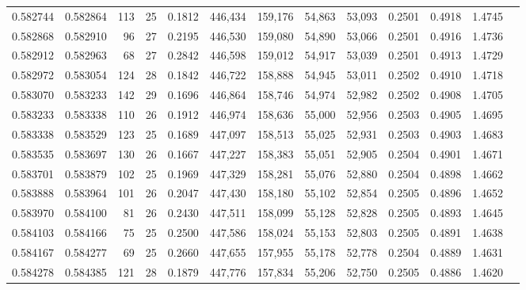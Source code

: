 \begin{tabular}{rrrrrrrrrrrrr}
0.582744 & 0.582864 &   113 &  25 &                                     0.1812 & 446,434 & 159,176 &  54,863 &  53,093 & 0.2501 & 0.4918 & 1.4745 \\
0.582868 & 0.582910 &    96 &  27 &                                     0.2195 & 446,530 & 159,080 &  54,890 &  53,066 & 0.2501 & 0.4916 & 1.4736 \\
0.582912 & 0.582963 &    68 &  27 &                                     0.2842 & 446,598 & 159,012 &  54,917 &  53,039 & 0.2501 & 0.4913 & 1.4729 \\
0.582972 & 0.583054 &   124 &  28 &                                     0.1842 & 446,722 & 158,888 &  54,945 &  53,011 & 0.2502 & 0.4910 & 1.4718 \\
0.583070 & 0.583233 &   142 &  29 &                                     0.1696 & 446,864 & 158,746 &  54,974 &  52,982 & 0.2502 & 0.4908 & 1.4705 \\
0.583233 & 0.583338 &   110 &  26 &                                     0.1912 & 446,974 & 158,636 &  55,000 &  52,956 & 0.2503 & 0.4905 & 1.4695 \\
0.583338 & 0.583529 &   123 &  25 &                                     0.1689 & 447,097 & 158,513 &  55,025 &  52,931 & 0.2503 & 0.4903 & 1.4683 \\
0.583535 & 0.583697 &   130 &  26 &                                     0.1667 & 447,227 & 158,383 &  55,051 &  52,905 & 0.2504 & 0.4901 & 1.4671 \\
0.583701 & 0.583879 &   102 &  25 &                                     0.1969 & 447,329 & 158,281 &  55,076 &  52,880 & 0.2504 & 0.4898 & 1.4662 \\
0.583888 & 0.583964 &   101 &  26 &                                     0.2047 & 447,430 & 158,180 &  55,102 &  52,854 & 0.2505 & 0.4896 & 1.4652 \\
0.583970 & 0.584100 &    81 &  26 &                                     0.2430 & 447,511 & 158,099 &  55,128 &  52,828 & 0.2505 & 0.4893 & 1.4645 \\
0.584103 & 0.584166 &    75 &  25 &                                     0.2500 & 447,586 & 158,024 &  55,153 &  52,803 & 0.2505 & 0.4891 & 1.4638 \\
0.584167 & 0.584277 &    69 &  25 &                                     0.2660 & 447,655 & 157,955 &  55,178 &  52,778 & 0.2504 & 0.4889 & 1.4631 \\
0.584278 & 0.584385 &   121 &  28 &                                     0.1879 & 447,776 & 157,834 &  55,206 &  52,750 & 0.2505 & 0.4886 & 1.4620 \\

\end{tabular}
